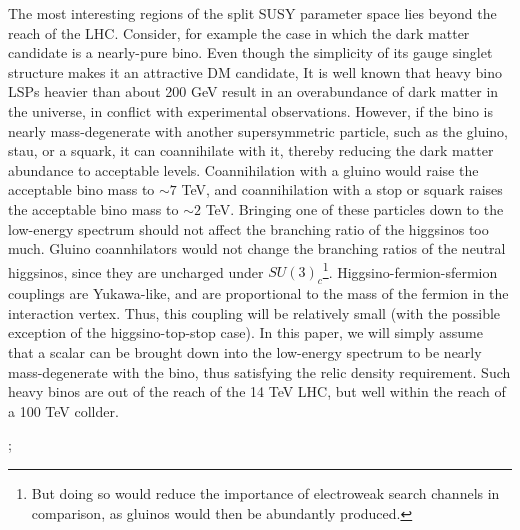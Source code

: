 The most interesting regions of the split SUSY parameter space lies beyond the reach of the LHC. Consider, for example the case in which the dark matter candidate is a nearly-pure bino. Even though the simplicity of its gauge singlet structure makes it an attractive DM candidate, It is well known that heavy bino LSPs heavier than about 200 GeV result in an overabundance of dark matter in the universe, in conflict with experimental observations. However, if the bino is nearly mass-degenerate with another supersymmetric particle, such as the gluino, stau, or a squark, it can coannihilate with it, thereby reducing the dark matter abundance to acceptable levels. Coannihilation with a gluino would raise the acceptable bino mass to $\sim 7$ TeV, and coannihilation with a stop or squark raises the acceptable bino mass to $\sim 2$ TeV. Bringing one of these particles down to the low-energy spectrum should not affect the branching ratio of the higgsinos too much. Gluino coannhilators would not change the branching ratios of the neutral higgsinos, since they are uncharged under $SU(3)_c$\footnote{But doing so would reduce the importance of electroweak search channels in comparison, as gluinos would then be abundantly produced.}. Higgsino-fermion-sfermion couplings are Yukawa-like, and are proportional to the mass of the fermion in the interaction vertex. Thus, this coupling will be relatively small (with the possible exception of the higgsino-top-stop case). In this paper, we will simply assume that a scalar can be brought down into the low-energy spectrum to be nearly mass-degenerate with the bino, thus satisfying the relic density requirement. Such heavy binos are out of the reach of the 14 TeV LHC, but well within the reach of a 100 TeV collder. 
\begin{marginfigure}
  ;
\end{marginfigure}

